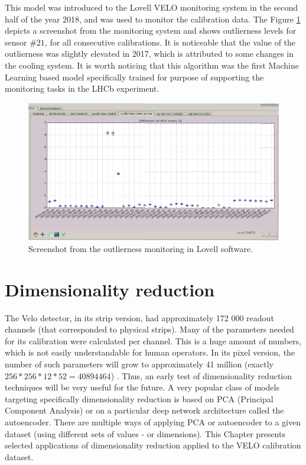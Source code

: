 This model was introduced to the Lovell VELO monitoring system in the second half of the year 2018, and was used to monitor the calibration data. The Figure \ref{plot:gui} depicts a screenshot from the monitoring system and shows outlierness levels for sensor $\#21$, for all consecutive calibrations. It is noticeable that the value of the outlierness was slightly elevated in 2017, which is attributed to some changes in the cooling system. It is worth noticing that this algorithm was the first Machine Learning based model specifically trained for purpose of supporting the monitoring tasks in the LHCb experiment. 


\begin{figure}
    \centering
    \includegraphics[width=0.9\linewidth]{figures/chapter4/outlierness/calina_lovell_screenshot.png}
    \caption{Screenshot from the outlierness monitoring in Lovell software.}
    \label{plot:gui}
  \end{figure}








\section{Dimensionality reduction}
\label{chap4:dimred}

The Velo detector, in its strip version, had approximately 172 000 readout channels (that corresponded to physical strips). Many of the parameters needed for its calibration were calculated per channel. This is a huge amount of numbers, which is not easily understandable for human operators.
In its pixel version, the number of such parameters will grow to approximately 41 million (exactly $256*256*12*52 = 40894464$) \cite{Collaboration:1624070}.
Thus, an early test of dimensionality reduction techniques will be very useful for the future. A very popular class of models targeting specifically dimensionality reduction is based on PCA (Principal Component Analysis) or on a particular deep network architecture called the autoencoder.
There are multiple ways of applying PCA or autoencoder to a given dataset (using different sets of values - or dimensions).
This Chapter presents selected applications of dimensionality reduction applied to the VELO calibration dataset.

